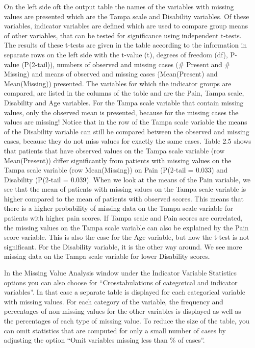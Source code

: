 \documentclass[]{book}
\theoremstyle{definition}
\theoremstyle{definition}
\theoremstyle{definition}
\theoremstyle{remark}
\begin{document}
On the left side oft the output table the names of the variables with
missing values are presented which are the Tampa scale and Disability
variables. Of these variables, indicator variables are defined which are
used to compare group means of other variables, that can be tested for
significance using independent t-tests. The results of these t-tests are
given in the table according to the information in separate rows on the
left side with the t-value (t), degrees of freedom (df), P-value
(P(2-tail)), numbers of observed and missing cases (\# Present and \#
Missing) and means of observed and missing cases (Mean(Present) and
Mean(Missing)) presented. The variables for which the indicator groups
are compared, are listed in the columns of the table and are the Pain,
Tampa scale, Disability and Age variables. For the Tampa scale variable
that contain missing values, only the observed mean is presented,
because for the missing cases the values are missing! Notice that in the
row of the Tampa scale variable the means of the Disability variable can
still be compared between the observed and missing cases, because they
do not miss values for exactly the same cases. Table 2.5 shows that
patients that have observed values on the Tampa scale variable (row
Mean(Present)) differ significantly from patients with missing values on
the Tampa scale variable (row Mean(Missing)) on Pain (P(2-tail = 0.033)
and Disability (P(2-tail = 0.039). When we look at the means of the Pain
variable, we see that the mean of patients with missing values on the
Tampa scale variable is higher compared to the mean of patients with
observed scores. This means that there is a higher probability of
missing data on the Tampa scale variable for patients with higher pain
scores. If Tampa scale and Pain scores are correlated, the missing
values on the Tampa scale variable can also be explained by the Pain
score variable. This is also the case for the Age variable, but now the
t-test is not significant. For the Disability variable, it is the other
way around. We see more missing data on the Tampa scale variable for
lower Disability scores.

In the Missing Value Analysis window under the Indicator Variable
Statistics options you can also choose for ``Crosstabulations of
categorical and indicator variables''. In that case a separate table is
displayed for each categorical variable with missing values. For each
category of the variable, the frequency and percentages of non-missing
values for the other variables is displayed as well as the percentages
of each type of missing value. To reduce the size of the table, you can
omit statistics that are computed for only a small number of cases by
adjusting the option ``Omit variables missing less than \% of cases''.
\end{document}
